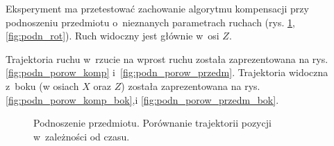 Eksperyment ma przetestować zachowanie algorytmu kompensacji przy podnoszeniu przedmiotu o~nieznanych parametrach ruchach (rys. \ref{fig:podn_a}, \ref{fig:podn_rot}). Ruch widoczny jest głównie w~osi $Z$.

Trajektoria ruchu w~rzucie na wprost ruchu została zaprezentowana na rys. \ref{fig:podn_porow_komp} i~\ref{fig:podn_porow_przedm}. Trajektoria widoczna z~boku (w osiach $X$ oraz $Z$) została zaprezentowana na rys. \ref{fig:podn_porow_komp_bok},i \ref{fig:podn_porow_przedm_bok}.


\begin{figure}[H]
	\centering
	\hfill
	

	\caption{Podnoszenie przedmiotu. Porównanie trajektorii pozycji w~zależności od czasu.}
	\label{fig:podn_a}

\end{figure}

